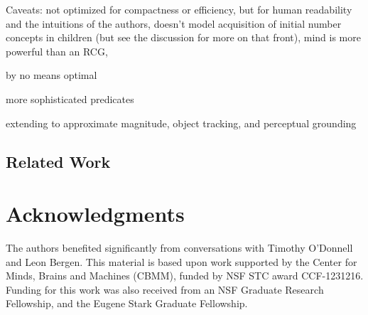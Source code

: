 \documentclass[10pt,letterpaper]{article}
\begin{document}
Caveats: not optimized for compactness or efficiency, but for human
readability and the intuitions of the authors, doesn't model
acquisition of initial number concepts in children (but see the
discussion for more on that front), mind is more powerful than an RCG,

by no means optimal

more sophisticated predicates

extending to approximate magnitude, object tracking, and perceptual grounding

\subsection{Related Work}

\section{Acknowledgments}

The authors benefited significantly from conversations with Timothy
O'Donnell and Leon Bergen. This material is based upon work supported
by the Center for Minds, Brains and Machines (CBMM), funded by NSF STC
award CCF-1231216. Funding for this work was also received from an NSF
Graduate Research Fellowship, and the Eugene Stark Graduate
Fellowship.




\setlength{\bibleftmargin}{.125in}
\setlength{\bibindent}{-\bibleftmargin}

\end{document}

